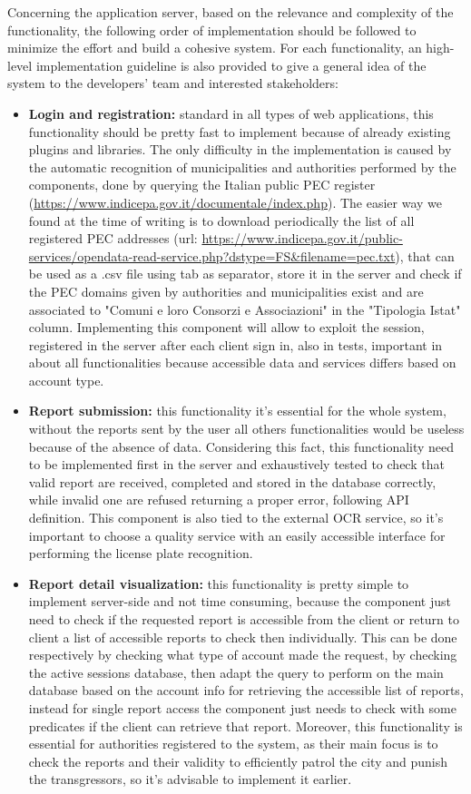 Concerning the application server, based on the relevance and complexity of the functionality, the following order of implementation should be followed to minimize the effort and build a cohesive system. For each functionality, an high-level implementation guideline is also provided to give a general idea of the system to the developers' team and interested stakeholders:
\begin{itemize}
	\item \textbf{Login and registration:} standard in all types of web applications, this functionality should be pretty fast to implement because of already existing plugins and libraries. The only difficulty in the implementation is caused by the automatic recognition of municipalities and authorities performed by the components, done by querying the Italian public PEC register (\url{https://www.indicepa.gov.it/documentale/index.php}). The easier way we found at the time of writing is to download periodically the list of all registered PEC addresses (url: \url{https://www.indicepa.gov.it/public-services/opendata-read-service.php?dstype=FS&filename=pec.txt}), that can be used as a .csv file using tab as separator, store it in the server and check if the PEC domains given by authorities and municipalities exist and are associated to "Comuni e loro Consorzi e Associazioni" in the "Tipologia Istat" column. Implementing this component will allow to exploit the session, registered in the server after each client sign in, also in tests, important in about all functionalities because accessible data and services differs based on account type.
	\item \textbf{Report submission:} this functionality it's essential for the whole system, without the reports sent by the user all others functionalities would be useless because of the absence of data. Considering this fact, this functionality need to be implemented first in the server and exhaustively tested to check that valid report are received, completed and stored in the database correctly, while invalid one are refused returning a proper error, following API definition. This component is also tied to the external OCR service, so it's important to choose a quality service with an easily accessible interface for performing the license plate recognition.
	\item \textbf{Report detail visualization:} this functionality is pretty simple to implement server-side and not time consuming, because the component just need to check if the requested report is accessible from the client or return to client a list of accessible reports to check then individually. This can be done respectively by checking what type of account made the request, by checking the active sessions database, then adapt the query to perform on the main database based on the account info for retrieving the accessible list of reports, instead for single report access the component just needs to check with some predicates if the client can retrieve that report. Moreover, this functionality is essential for authorities registered to the system, as their main focus is to check the reports and their validity to efficiently patrol the city and punish the transgressors, so it's advisable to implement it earlier.

\end{itemize}
